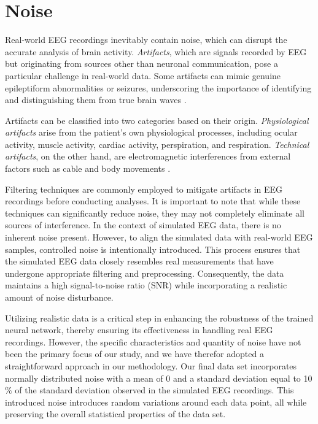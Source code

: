 \documentclass[a4paper, UKenglish, 11pt]{uiomaster}
\begin{document}
\section{Noise} \label{chap:noise}
Real-world EEG recordings inevitably contain noise, which can disrupt the accurate analysis of brain activity. \emph{Artifacts}, which are signals recorded by EEG but originating from sources other than neuronal communication, pose a particular challenge in real-world data. Some artifacts can mimic genuine epileptiform abnormalities or seizures, underscoring the importance of identifying and distinguishing them from true brain waves \cite{sazgar2019eeg}.

Artifacts can be classified into two categories based on their origin. \emph{Physiological artifacts} arise from the patient's own physiological processes, including ocular activity, muscle activity, cardiac activity, perspiration, and respiration. \emph{Technical artifacts}, on the other hand, are electromagnetic interferences from external factors such as cable and body movements \cite{bitbrain}.

Filtering techniques are commonly employed to mitigate artifacts in EEG recordings before conducting analyses. It is important to note that while these techniques can significantly reduce noise, they may not completely eliminate all sources of interference. In the context of simulated EEG data, there is no inherent noise present. However, to align the simulated data with real-world EEG samples, controlled noise is intentionally introduced. This process ensures that the simulated EEG data closely resembles real measurements that have undergone appropriate filtering and preprocessing. Consequently, the data maintains a high signal-to-noise ratio (SNR) while incorporating a realistic amount of noise disturbance.

Utilizing realistic data is a critical step in enhancing the robustness of the trained neural network, thereby ensuring its effectiveness in handling real EEG recordings. However, the specific characteristics and quantity of noise have not been the primary focus of our study, and we have therefor adopted a straightforward approach in our methodology. Our final data set incorporates normally distributed noise with a mean of 0 and a standard deviation equal to 10$\%$ of the standard deviation observed in the simulated EEG recordings. This introduced noise introduces random variations around each data point, all while preserving the overall statistical properties of the data set.
\end{document}
